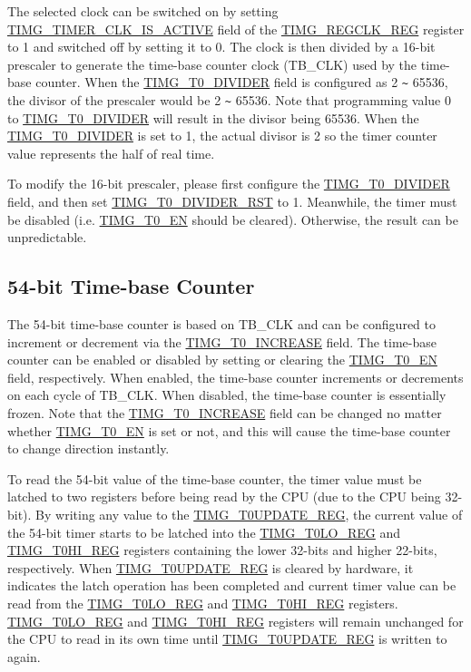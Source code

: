 \documentclass[main\_\_EN.tex]{subfiles}
\begin{document}
The selected clock can be switched on by setting \hyperref[fielddesc:TIMGTIMERCLKISACTIVE]{TIMG\_TIMER\_CLK\_IS\_ACTIVE} field of the \hyperref[regdesc:TIMGREGCLKREG]{TIMG\_REGCLK\_REG} register to 1 and switched off by setting it to 0. The clock is then divided by a 16-bit prescaler to generate the time-base counter clock (TB\_CLK) used by the time-base counter. When the \hyperref[fielddesc:TIMGTXDIVIDER]{TIMG\_T0\_DIVIDER} field 
is configured as 2 \verb+~+ 65536, the divisor of the prescaler would be 2 \verb+~+ 65536. Note that programming value 0 to \hyperref[fielddesc:TIMGTXDIVIDER]{TIMG\_T0\_DIVIDER} will result in the divisor being 65536. When the \hyperref[fielddesc:TIMGTXDIVIDER]{TIMG\_T0\_DIVIDER} is set to 1, the actual divisor is 2 so the timer counter value represents the half of real time.

To modify the 16-bit prescaler, please first configure the \hyperref[fielddesc:TIMGTXDIVIDER]{TIMG\_T0\_DIVIDER} field, and then set \hyperref[fielddesc:TIMGTXDIVIDERRST]{TIMG\_T0\_DIVIDER\_RST} to 1. Meanwhile, the timer must be disabled (i.e. \hyperref[fielddesc:TIMGTXEN]{TIMG\_T0\_EN} should be cleared). Otherwise, the result can be unpredictable.

\subsection{54-bit Time-base Counter}
The 54-bit time-base counter is based on TB\_CLK and can be configured to increment or decrement via the \hyperref[fielddesc:TIMGTXINCREASE]{TIMG\_T0\_INCREASE} field. The time-base counter can be enabled or disabled by setting or clearing the \hyperref[fielddesc:TIMGTXEN]{TIMG\_T0\_EN} field, respectively. When enabled, the time-base counter increments or decrements on each cycle of TB\_CLK. When disabled, the time-base counter is essentially frozen. Note that the \hyperref[fielddesc:TIMGTXINCREASE]{TIMG\_T0\_INCREASE} field can be changed no matter whether \hyperref[fielddesc:TIMGTXEN]{TIMG\_T0\_EN} is set or not, and this will cause the time-base counter to change direction instantly.

To read the 54-bit value of the time-base counter, the timer value must be latched to two registers before being read by the CPU (due to the CPU being 32-bit). By writing any value to the \hyperref[regdesc:TIMGTXUPDATEREG]{TIMG\_T0UPDATE\_REG}, the current value of the 54-bit timer starts to be latched into the \hyperref[regdesc:TIMGTXLOREG]{TIMG\_T0LO\_REG} and \hyperref[regdesc:TIMGTXHIREG]{TIMG\_T0HI\_REG} registers containing the lower 32-bits and 
higher 22-bits, respectively. When \hyperref[regdesc:TIMGTXUPDATEREG]{TIMG\_T0UPDATE\_REG} is cleared by hardware, it indicates the latch operation has been completed and current timer value can be read from the \hyperref[regdesc:TIMGTXLOREG]{TIMG\_T0LO\_REG} and \hyperref[regdesc:TIMGTXHIREG]{TIMG\_T0HI\_REG} registers. \hyperref[regdesc:TIMGTXLOREG]{TIMG\_T0LO\_REG} and \hyperref[regdesc:TIMGTXHIREG]{TIMG\_T0HI\_REG} registers will remain unchanged for the CPU to read in its own time until \hyperref[regdesc:TIMGTXUPDATEREG]{TIMG\_T0UPDATE\_REG} is written to again.
\end{document}
